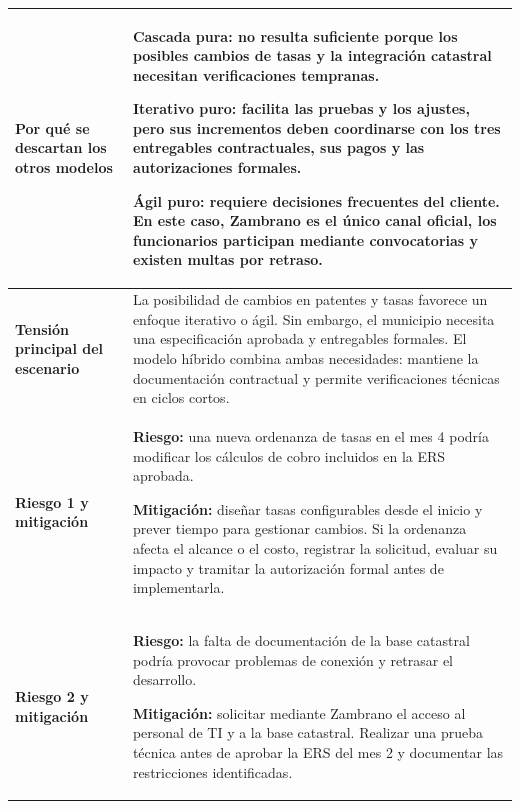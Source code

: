 \documentclass[12pt,a4paper]{article}
\begin{document}
\begin{longtable}{
>{\raggedright\arraybackslash}p{3.2cm}
>{\raggedright\arraybackslash}p{11.7cm}
}
\textbf{Por qué se descartan los otros modelos} &
\textbf{Cascada pura:} no resulta suficiente porque
los posibles cambios de tasas y la integración catastral
necesitan verificaciones tempranas.

\par\medskip

\textbf{Iterativo puro:} facilita las pruebas y los ajustes,
pero sus incrementos deben coordinarse con los tres
entregables contractuales, sus pagos y las autorizaciones
formales.

\par\medskip

\textbf{Ágil puro:} requiere decisiones frecuentes del
cliente. En este caso, Zambrano es el único canal oficial,
los funcionarios participan mediante convocatorias y
existen multas por retraso. \\
\midrule

\textbf{Tensión principal del escenario} &
La posibilidad de cambios en patentes y tasas favorece
un enfoque iterativo o ágil. Sin embargo, el municipio
necesita una especificación aprobada y entregables
formales. El modelo híbrido combina ambas necesidades:
mantiene la documentación contractual y permite
verificaciones técnicas en ciclos cortos. \\
\midrule

\textbf{Riesgo 1 y mitigación} &
\textbf{Riesgo:} una nueva ordenanza de tasas en el mes 4
podría modificar los cálculos de cobro incluidos en la
ERS aprobada.

\par\medskip

\textbf{Mitigación:} diseñar tasas configurables desde
el inicio y prever tiempo para gestionar cambios.
Si la ordenanza afecta el alcance o el costo, registrar
la solicitud, evaluar su impacto y tramitar la autorización
formal antes de implementarla. \\
\midrule

\textbf{Riesgo 2 y mitigación} &
\textbf{Riesgo:} la falta de documentación de la base
catastral podría provocar problemas de conexión y
retrasar el desarrollo.

\par\medskip

\textbf{Mitigación:} solicitar mediante Zambrano el
acceso al personal de TI y a la base catastral. Realizar
una prueba técnica antes de aprobar la ERS del mes 2
y documentar las restricciones identificadas. \\

\bottomrule
\end{longtable}
\endgroup
\end{document}
